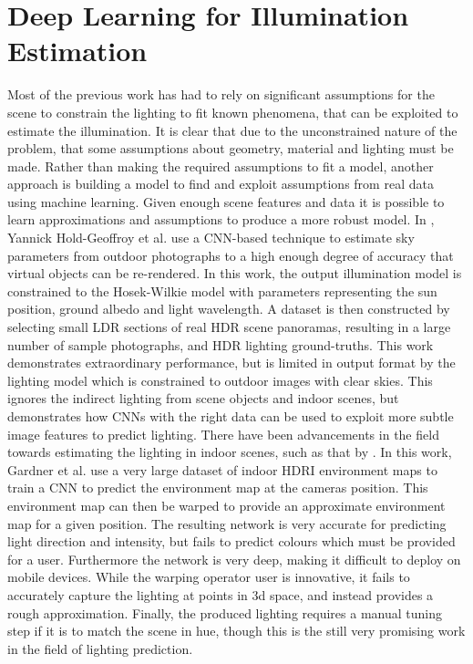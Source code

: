 \documentclass[ %
                    author={Gavin Parker},
                supervisor={Dr. Neill Campbell},
                    degree={MEng},
                     title={Deep Siamese Networks for Illumination Estimation from Stereo Images},
                  subtitle={},
                      type={research},
                      year={2018} ]{dissertation}
\begin{document}
\section{Deep Learning for Illumination Estimation}
Most of the previous work has had to rely on significant assumptions for the scene to constrain the lighting to fit known phenomena, that can be exploited to estimate the illumination. It is clear that due to the unconstrained nature of the problem, that some assumptions about geometry, material and lighting must be made. Rather than making the required assumptions to fit a model, another approach is building a model to find and exploit assumptions from real data using machine learning. Given enough scene features and data it is possible to learn approximations and assumptions to produce a more robust model. In \cite{holdgeoffroy-cvpr-17}, Yannick Hold-Geoffroy et al. use a CNN-based technique to estimate sky parameters from outdoor photographs to a high enough degree of accuracy that virtual objects can be re-rendered. In this work, the output illumination model is constrained to the Hosek-Wilkie model with parameters representing the sun position, ground albedo and light wavelength. A dataset is then constructed by selecting small LDR sections of real HDR scene panoramas, resulting in a large number of sample photographs, and HDR lighting ground-truths. This work demonstrates extraordinary performance, but is limited in output format by the lighting model which is constrained to outdoor images with clear skies. This ignores the indirect lighting from scene objects and indoor scenes, but demonstrates how CNNs with the right data can be used to exploit more subtle image features to predict lighting.
\newline
There have been advancements in the field towards estimating the lighting in indoor scenes, such as that by \cite{Gardner:2017:LPI:3130800.3130891}. In this work, Gardner et al. use a very large dataset of indoor HDRI environment maps to train a CNN to predict the environment map at the cameras position. This environment map can then be warped to provide an approximate environment map for a given position. The resulting network is very accurate for predicting light direction and intensity, but fails to predict colours which must be provided for a user. Furthermore the network is very deep, making it difficult to deploy on mobile devices. While the warping operator user is innovative, it fails to accurately capture the lighting at points in 3d space, and instead provides a rough approximation. Finally, the produced lighting requires a manual tuning step if it is to match the scene in hue, though this is the still very promising work in the field of lighting prediction.
\end{document}
